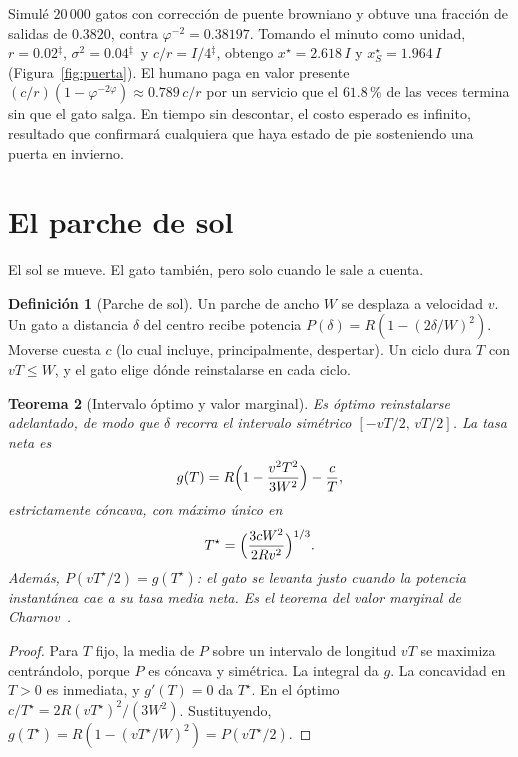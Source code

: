 \documentclass[11pt,a4paper]{article}
\theoremstyle{plain}
\newtheorem{teorema}{Teorema}[section]
\theoremstyle{definition}
\newtheorem{definicion}[teorema]{Definición}
\theoremstyle{remark}
\numberwithin{equation}{section}
\newcommand{\calib}{{\ensuremath{^{\ddagger}}}}
\begin{document}
Simulé $20\,000$ gatos con corrección de puente browniano y obtuve una fracción de salidas de $0.3820$, contra $\varphi^{-2}=0.38197$. Tomando el minuto como unidad, $r=0.02$\calib, $\sigma^2=0.04$\calib\ y $c/r=I/4$\calib, obtengo $x^\star=2.618\,I$ y $x_S^\star=1.964\,I$ (Figura~\ref{fig:puerta}). El humano paga en valor presente $(c/r)(1-\varphi^{-2\varphi})\approx 0.789\,c/r$ por un servicio que el $61.8$\,\% de las veces termina sin que el gato salga. En tiempo sin descontar, el costo esperado es infinito, resultado que confirmará cualquiera que haya estado de pie sosteniendo una puerta en invierno.

\section{El parche de sol}\label{sec:sol}

El sol se mueve. El gato también, pero solo cuando le sale a cuenta.

\begin{definicion}[Parche de sol]
Un parche de ancho $W$ se desplaza a velocidad $v$. Un gato a distancia $\delta$ del centro recibe potencia $P(\delta)=R(1-(2\delta/W)^2)$. Moverse cuesta $c$ (lo cual incluye, principalmente, despertar). Un ciclo dura $T$ con $vT\le W$, y el gato elige dónde reinstalarse en cada ciclo.
\end{definicion}

\begin{teorema}[Intervalo óptimo y valor marginal]\label{teo:sol}
Es óptimo reinstalarse adelantado, de modo que $\delta$ recorra el intervalo simétrico $[-vT/2,\,vT/2]$. La tasa neta es
\begin{equation}
  g(T)=R\Bigl(1-\frac{v^2T^2}{3W^2}\Bigr)-\frac{c}{T},
\end{equation}
estrictamente cóncava, con máximo único en
\begin{equation}
  T^\star=\Bigl(\frac{3cW^2}{2Rv^2}\Bigr)^{1/3}.
\end{equation}
Además, $P(vT^\star/2)=g(T^\star)$: el gato se levanta justo cuando la potencia instantánea cae a su tasa media neta. Es el teorema del valor marginal de Charnov~\cite{charnov}.
\end{teorema}

\begin{proof}
Para $T$ fijo, la media de $P$ sobre un intervalo de longitud $vT$ se maximiza centrándolo, porque $P$ es cóncava y simétrica. La integral da $g$. La concavidad en $T>0$ es inmediata, y $g'(T)=0$ da $T^\star$. En el óptimo $c/T^\star=2R(vT^\star)^2/(3W^2)$. Sustituyendo, $g(T^\star)=R(1-(vT^\star/W)^2)=P(vT^\star/2)$.
\end{proof}
\end{document}

